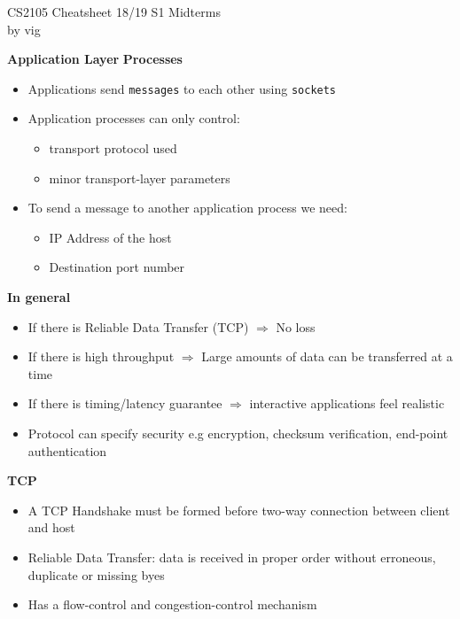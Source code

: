 \documentclass[a4paper]{article} \usepackage[backend=biber, style=numeric, sorting=none]{biblatex}
\begin{document}
\setlength\parindent{0pt} %
\scriptsize
{}

\begin{center}
{\large CS2105 Cheatsheet 18/19 S1 Midterms}\\{by vig}
\end{center}
    \begin{multicols*}{4}

{\small\textbf{Application Layer}}
\textbf{Processes}
\begin{itemize}[leftmargin=*]
\itemsep -0.5em
\item Applications send \texttt{messages} to each other using \texttt{sockets}
\item Application processes can only control:
  \begin{itemize}[leftmargin=*]
  \item transport protocol used
  \item minor transport-layer parameters
  \end{itemize}
\item To send a message to another application process we need:
  \begin{itemize}[leftmargin=*]
  \item IP Address of the host
  \item Destination port number
  \end{itemize}
\end{itemize}

\textbf{In general}
\begin{itemize}[leftmargin=*]
\item If there is Reliable Data Transfer (TCP) $\Rightarrow$ No loss
\item If there is high throughput $\Rightarrow$ Large amounts of data can be transferred at a time
\item If there is timing/latency guarantee $\Rightarrow$ interactive applications feel realistic
\item Protocol can specify security e.g encryption, checksum verification, end-point authentication
\end{itemize}

\textbf{TCP}
\begin{itemize}[leftmargin=*]
\item A TCP Handshake must be formed before two-way connection between client and host
\item Reliable Data Transfer: data is received in proper order without erroneous, duplicate or missing byes
\item Has a flow-control and congestion-control mechanism
\end{itemize}


\end{multicols*}
\end{document}

